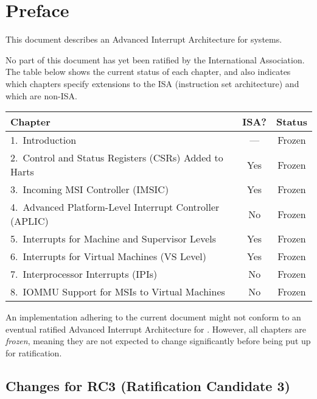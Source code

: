 
\chapter{Preface}

This document describes an Advanced Interrupt Architecture
for {\RISCV} systems.

No part of this document has yet been ratified
by the {\RISCV} International Association.
The table below shows the current status of each chapter,
and also indicates which chapters specify extensions to the
{\RISCV} ISA (instruction set architecture) and which are non-ISA.

{
\begin{table}[hbt]
\centering
\begin{tabular}{|l|c|c|}
\hline
Chapter                                                  & ISA? & Status \\
\hline
\hline
1.\ Introduction                                         & ---  & Frozen \\
2.\ Control and Status Registers (CSRs) Added to Harts   & Yes  & Frozen \\
3.\ Incoming MSI Controller (IMSIC)                      & Yes  & Frozen \\
4.\ Advanced Platform-Level Interrupt Controller (APLIC) & No   & Frozen \\
5.\ Interrupts for Machine and Supervisor Levels         & Yes  & Frozen \\
6.\ Interrupts for Virtual Machines (VS Level)           & Yes  & Frozen \\
7.\ Interprocessor Interrupts (IPIs)                     & No   & Frozen \\
8.\ IOMMU Support for MSIs to Virtual Machines           & No   & Frozen \\
\hline
\end{tabular}
\end{table}
}

An implementation adhering to the current document might not conform
to an eventual ratified Advanced Interrupt Architecture for {\RISCV}.
However, all chapters are \emph{frozen}, meaning they are not expected
to change significantly before being put up for ratification.

\section*{Changes for RC3 (Ratification Candidate 3)}

